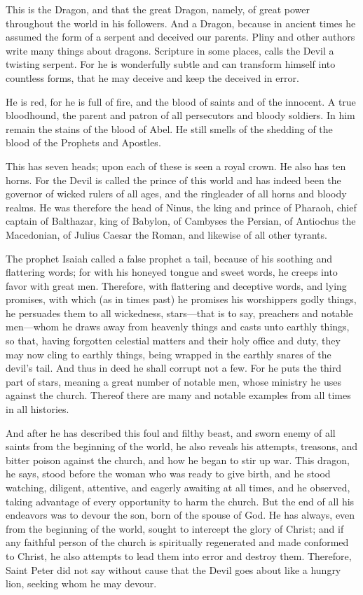 This is the Dragon, and that the great Dragon, namely, of great power throughout the world in his followers. And a Dragon, because in ancient times he assumed the form of a serpent and deceived our parents. Pliny and other authors write many things about dragons. Scripture in some places, calls the Devil a twisting serpent. For he is wonderfully subtle and can transform himself into countless forms, that he may deceive and keep the deceived in error.

He is red, for he is full of fire, and the blood of saints and of the innocent. A true bloodhound, the parent and patron of all persecutors and bloody soldiers. In him remain the stains of the blood of Abel. He still smells of the shedding of the blood of the Prophets and Apostles.

This has seven heads; upon each of these is seen a royal crown. He also has ten horns. For the Devil is called the prince of this world and has indeed been the governor of wicked rulers of all ages, and the ringleader of all horns and bloody realms. He was therefore the head of Ninus, the king and prince of Pharaoh, chief captain of Balthazar, king of Babylon, of Cambyses the Persian, of Antiochus the Macedonian, of Julius Caesar the Roman, and likewise of all other tyrants.

The prophet Isaiah called a false prophet a tail, because of his soothing and flattering words; for with his honeyed tongue and sweet words, he creeps into favor with great men. Therefore, with flattering and deceptive words, and lying promises, with which (as in times past) he promises his worshippers godly things, he persuades them to all wickedness, stars—that is to say, preachers and notable men—whom he draws away from heavenly things and casts unto earthly things, so that, having forgotten celestial matters and their holy office and duty, they may now cling to earthly things, being wrapped in the earthly snares of the devil’s tail. And thus in deed he shall corrupt not a few. For he puts the third part of stars, meaning a great number of notable men, whose ministry he uses against the church. Thereof there are many and notable examples from all times in all histories.

And after he has described this foul and filthy beast, and sworn enemy of all saints from the beginning of the world, he also reveals his attempts, treasons, and bitter poison against the church, and how he began to stir up war. This dragon, he says, stood before the woman who was ready to give birth, and he stood watching, diligent, attentive, and eagerly awaiting at all times, and he observed, taking advantage of every opportunity to harm the church. But the end of all his endeavors was to devour the son, born of the spouse of God. He has always, even from the beginning of the world, sought to intercept the glory of Christ; and if any faithful person of the church is spiritually regenerated and made conformed to Christ, he also attempts to lead them into error and destroy them. Therefore, Saint Peter did not say without cause that the Devil goes about like a hungry lion, seeking whom he may devour.

